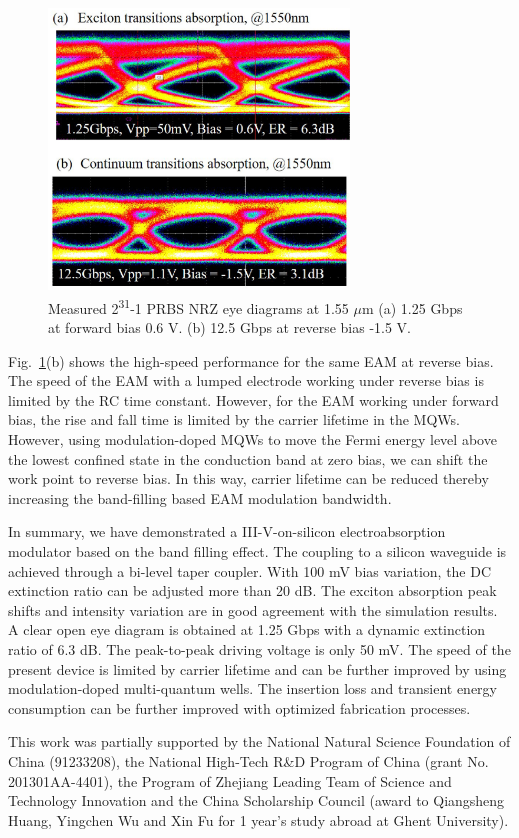 \documentclass[aip,apl,reprint,a4paper]{revtex4-1}
\def\SP#1{\textsuperscript{#1}}
\begin{document}
\begin{figure}
	\includegraphics[width=8cm]{figure/fig6.eps}%
	\caption{\label{fig:6} Measured 2\SP{31}-1 PRBS NRZ eye diagrams at 1.55 $\mu$m (a) 1.25 Gbps at forward bias 0.6 V.  (b) 12.5 Gbps at reverse bias -1.5 V.}
\end{figure}


Fig.~\ref{fig:6}(b) shows the high-speed performance for the same EAM at reverse bias. The speed of the EAM with a lumped electrode working under reverse bias is limited by the RC time constant.\cite{Yong40,fu52015} However, for the EAM working under forward bias, the rise and fall time is limited by the carrier lifetime in the MQWs. However, using modulation-doped MQWs to move the Fermi energy level above the lowest confined state in the conduction band at zero bias, we can shift the work point to reverse bias.\cite{livescu1988free,kalinovsky1993free}  In this way, carrier lifetime can be reduced thereby increasing the band-filling based EAM modulation bandwidth.


In summary, we have demonstrated a III-V-on-silicon electroabsorption modulator based on the band filling effect. The coupling to a silicon waveguide is achieved through a bi-level taper coupler. With 100 mV bias variation, the DC extinction ratio can be adjusted more than 20 dB. The exciton absorption peak shifts and intensity variation are in good agreement with the simulation results. A clear open eye diagram is obtained at 1.25 Gbps with a dynamic extinction ratio of 6.3 dB. The peak-to-peak driving voltage is only 50 mV. The speed of the present device is limited by carrier lifetime and can be further improved by using modulation-doped multi-quantum wells. The insertion loss and transient energy consumption can be further improved with optimized fabrication processes. 

\begin{acknowledgments}
This work was partially supported by the National Natural Science Foundation of China (91233208), the National High-Tech R\&D Program of China (grant No. 201301AA-4401), the Program of Zhejiang Leading Team of Science and Technology Innovation and the China Scholarship Council (award to Qiangsheng Huang, Yingchen Wu and Xin Fu for 1 year’s study abroad at Ghent University).
\end{acknowledgments}


\end{document}
